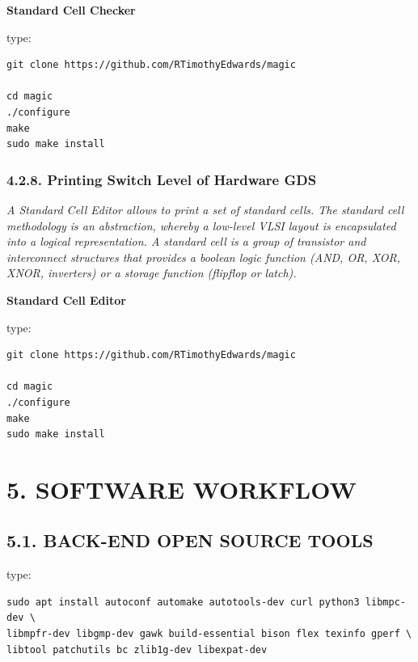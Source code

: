 \documentclass[
]{article}
\begin{document}
\textbf{Standard Cell Checker}

type:

\begin{verbatim}
git clone https://github.com/RTimothyEdwards/magic

cd magic
./configure
make
sudo make install
\end{verbatim}

\hypertarget{printing-switch-level-of-hardware-gds-1}{%
\subsubsection{4.2.8. Printing Switch Level of Hardware
GDS}\label{printing-switch-level-of-hardware-gds-1}}

\emph{A Standard Cell Editor allows to print a set of standard cells.
The standard cell methodology is an abstraction, whereby a low-level
VLSI layout is encapsulated into a logical representation. A standard
cell is a group of transistor and interconnect structures that provides
a boolean logic function (AND, OR, XOR, XNOR, inverters) or a storage
function (flipflop or latch).}

\textbf{Standard Cell Editor}

type:

\begin{verbatim}
git clone https://github.com/RTimothyEdwards/magic

cd magic
./configure
make
sudo make install
\end{verbatim}

\hypertarget{software-workflow-1}{%
\section{5. SOFTWARE WORKFLOW}\label{software-workflow-1}}

\hypertarget{back-end-open-source-tools-3}{%
\subsection{5.1. BACK-END OPEN SOURCE
TOOLS}\label{back-end-open-source-tools-3}}

type:

\begin{verbatim}
sudo apt install autoconf automake autotools-dev curl python3 libmpc-dev \
libmpfr-dev libgmp-dev gawk build-essential bison flex texinfo gperf \
libtool patchutils bc zlib1g-dev libexpat-dev
\end{verbatim}
\end{document}
